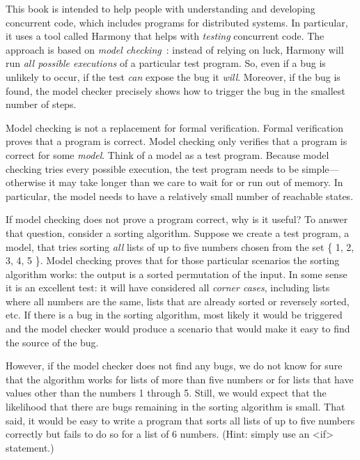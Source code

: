 \documentclass{report}
\begin{document}
This book is intended to help people with understanding and
developing concurrent code, which includes programs for distributed
systems.  In particular, it uses a tool
called Harmony that helps with \emph{testing} concurrent code.
The approach is based on \emph{model checking}~\cite{CES86}:
%
instead of relying
on luck, Harmony will run \emph{all possible executions} of a particular
test program.  So, even if a bug is unlikely to occur, if the test
\emph{can} expose the bug it \emph{will}.  Moreover, if the bug is
found, the model checker precisely shows how to trigger the bug in
the smallest number of steps.

Model checking is not a replacement for formal verification.
%
Formal verification proves that a program is correct.  Model checking only
verifies that a program is correct for some \emph{model}.  Think of
a model as a test program.
Because model checking tries every possible execution, the test
program needs to be simple---otherwise it may take longer than we
care to wait for or run out of memory.
In particular, the model needs to have a relatively small number of
reachable states.

If model checking does not prove a program correct, why is it
useful?
To answer that question, consider a sorting algorithm.
Suppose we create a test program, a model, that tries sorting
\emph{all} lists of up to five numbers chosen from the set
\{ 1, 2, 3, 4, 5 \}.  Model checking proves that for those particular
scenarios the sorting algorithm works: the output is a sorted
permutation of the input.  In some sense it is an excellent test:
it will have considered all \emph{corner cases},
%
including lists where all
numbers are the same, lists that are already sorted or reversely
sorted, etc.  If there is a bug in the sorting algorithm, most
likely it would be triggered and the model checker would produce a
scenario that would make it easy to find the source of the bug.

However, if the model checker does not find any bugs, we do not
know for sure that the algorithm works for lists of more than
five numbers or for lists that have values other than the numbers
1 through 5.  Still, we would expect that the likelihood that there
are bugs remaining in the sorting algorithm is small.
That said, it would be easy to write a program
that sorts all lists of up to five numbers correctly but fails to
do so for a list of 6 numbers.  (Hint: simply use an <{if}>
statement.)
\end{document}
